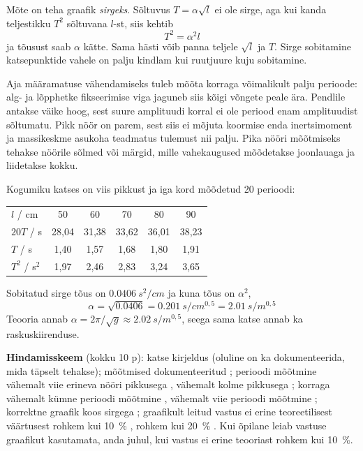 Mõte on teha graafik \emph{sirgeks}. Sõltuvus $T = \alpha\sqrt{l}$ ei ole
sirge, aga kui kanda teljestikku $T^2$ sõltuvana $l$-st, siis kehtib
\[
T^2 = \alpha^2 l
\]
ja tõusust saab $\alpha$ kätte. Sama hästi võib panna teljele $\sqrt{l}$ ja
$T$. Sirge sobitamine katsepunktide vahele on palju kindlam kui ruutjuure
kuju sobitamine.

Aja määramatuse vähendamiseks tuleb mõõta korraga võimalikult palju
perioode: alg- ja lõpphetke fikseerimise viga jaguneb siis kõigi võngete
peale ära. Pendlile antakse väike hoog, sest suure amplituudi korral ei ole
periood enam amplituudist sõltumatu. Pikk nöör on parem, sest siis ei mõjuta
koormise enda inertsimoment ja massikeskme asukoha teadmatus tulemust nii
palju. Pika nööri mõõtmiseks tehakse nöörile sõlmed või märgid, mille
vahekaugused mõõdetakse joonlauaga ja liidetakse kokku.

Kogumiku katses on viis pikkust ja iga kord mõõdetud 20 perioodi:

\begin{center}
\begin{tabular}{lccccc}
\hline
$l$ / cm & 50 & 60 & 70 & 80 & 90 \\
$20T$ / s & 28,04 & 31,38 & 33,62 & 36,01 & 38,23 \\
$T$ / s & 1,40 & 1,57 & 1,68 & 1,80 & 1,91 \\
$T^2$ / s$^2$ & 1,97 & 2,46 & 2,83 & 3,24 & 3,65 \\
\hline
\end{tabular}
\end{center}

Sobitatud sirge tõus on $\SI{0,0406}{s^2/cm}$ ja kuna tõus on $\alpha^2$,
\[
\alpha = \sqrt{\num{0,0406}} = \SI{0,201}{s/cm^{0,5}}
= \SI{2,01}{s/m^{0,5}}
\]
Teooria annab $\alpha = 2\pi/\sqrt{g} \approx \SI{2,02}{s/m^{0,5}}$, seega
sama katse annab ka raskuskiirenduse.

\textbf{Hindamisskeem} (kokku 10 p): katse kirjeldus  (oluline on ka
dokumenteerida, mida täpselt tehakse); mõõtmised dokumenteeritud ;
perioodi mõõtmine vähemalt viie erineva nööri pikkusega , vähemalt
kolme pikkusega ; korraga vähemalt kümne perioodi mõõtmine ,
vähemalt viie perioodi mõõtmine ; korrektne graafik koos sirgega
; graafikult leitud vastus ei erine teoreetilisest väärtusest rohkem
kui \SI{10}{\percent} , rohkem kui \SI{20}{\percent} . Kui
õpilane leiab vastuse graafikut kasutamata, anda  juhul, kui vastus ei
erine teooriast rohkem kui \SI{10}{\percent}.
